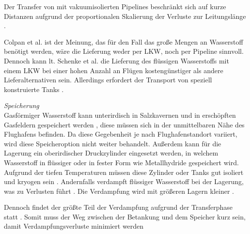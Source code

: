 Der Transfer von  mit vakuumisolierten Pipelines beschränkt sich auf kurze Distanzen
aufgrund der proportionalen Skalierung der Verluste zur Leitungslänge \cite{colpan2022fuel}.

Colpan et al.\cite{colpan2022fuel} ist der Meinung, 
das für den Fall das große Mengen an Wasserstoff benötigt werden, 
wäre die Lieferung weder per LKW, noch per Pipeline sinnvoll. 
%
Dennoch kann lt. Schenke et al. \cite{schenke2024lh2} die Lieferung des flüssigen Wasserstoffs 
mit einem LKW bei einer hohen Anzahl an Flügen kostengünstiger als andere Lieferalternativen sein.
Allerdings erfordert der Transport von  speziell konstruierte Tanks \cite{mulder2019outlook}.

%

\textit{Speicherung}\\
Gasförmiger Wasserstoff kann unterirdisch in Salzkavernen 
und in erschöpften Gasfeldern gespeichert werden \cite{undertaking2022strategic}, 
diese müssen sich in der unmittelbaren Nähe des Flughafens befinden. 
Da diese Gegebenheit je nach Flughafenstandort variiert, 
wird diese Speicheroption nicht weiter behandelt.
Außerdem kann für die Lagerung ein oberirdischer Druckzylinder eingesetzt werden, 
in welchem Wasserstoff in flüssiger oder in fester Form wie Metallhydride gespeichert wird.
Aufgrund der tiefen Temperaturen müssen diese Zylinder oder Tanks gut isoliert und kryogen sein \cite{undertaking2022strategic}.
Andernfalls verdampft flüssiger Wasserstoff bei der Lagerung, 
was zu Verlusten führt \cite{undertaking2022strategic}. 
Die Verdampfung wird mit größeren Lagern kleiner \cite{colpan2022fuel}.

Dennoch findet der größte Teil der Verdampfung aufgrund 
der Transferphase statt \cite{undertaking2022strategic}.
Somit muss der Weg zwischen der Betankung und dem Speicher kurz sein, 
damit Verdampfungsverluste minimiert werden \cite{colpan2022fuel}

